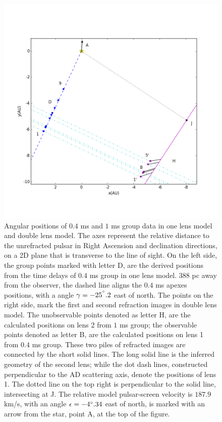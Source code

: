 \documentclass[useAMS,usenatbib]{mn2e}
\begin{document}
\begin{figure}
\centering
\includegraphics[width=1.0\textwidth, angle=0]{Double_lens_xy.png}
\caption{Angular positions of $0.4$ ms and $1$ ms group data in one lens model and double lens model. The axes represent the relative distance to the unrefracted pulsar in Right Ascension and declination directions, on a 2D plane that is transverse to the line of sight. %
On the left side, the group points marked with letter D, are the derived positions from the time delays of $0.4$ ms group in one lens model. $388$ pc away from the observer, the dashed line aligns the $0.4$ ms apexes positions, with a angle $\gamma=-25^{\degree}.2$ east of north. The points on the right side, mark the first and second refraction images in double lens model. The unobservable points denoted as letter H, are the calculated positions on lens 2 from $1$ ms group; the observable points denoted as letter B, are the calculated positions on lens 1 from $0.4$ ms group. These two piles of refracted images are connected by the short solid lines. The long solid line is the inferred geometry of the second lens; while the dot dash lines, constructed perpendicular to the AD scattering axis, denote the positions of lens 1. The dotted line on the top right is perpendicular to the solid line, intersecting at J. %
The relative model pulsar-screen velocity is $187.9$ km/s, with an angle $\epsilon=-4\degree.34$ east of north, is marked with an arrow from the star, point A, at the top of the figure.} 
\label{Doublelens}
\end{figure}
\end{document}
